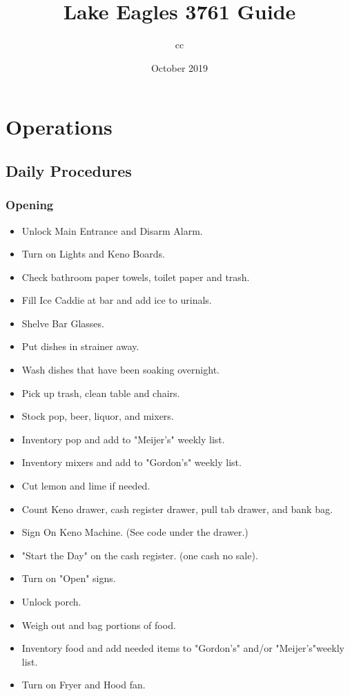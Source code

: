 \documentclass[11pt]{article}
\author{cc}
\date{October 2019}
\title{Lake Eagles 3761 Guide}
\begin{document}
\maketitle
\tableofcontents



\section{Operations}
\label{sec-1}

\subsection{Daily Procedures}
\label{sec-1-1}

\subsubsection{Opening}
\label{sec-1-1-1}
\begin{itemize}
\item Unlock Main Entrance and Disarm Alarm.
\item Turn on Lights and Keno Boards.
\item Check bathroom paper towels, toilet paper and trash.
\item Fill Ice Caddie at bar and add ice to urinals.
\item Shelve Bar Glasses.
\item Put dishes in strainer away.
\item Wash dishes that have been soaking overnight.
\item Pick up trash, clean table and chairs.
\item Stock pop, beer, liquor, and mixers.
\item Inventory pop and add to "Meijer's" weekly list.
\item Inventory mixers and add to "Gordon's" weekly list.
\item Cut lemon and lime if needed.
\item Count Keno drawer, cash register drawer, pull tab drawer, and bank bag.
\item Sign On Keno Machine. (See code under the drawer.)
\item "Start the Day" on the cash register. (one cash no sale).
\item Turn on "Open" signs.
\item Unlock porch.
\item Weigh out and bag portions of food.
\item Inventory food and add needed items to "Gordon's" and/or "Meijer's"weekly list.
\item Turn on Fryer and Hood fan.
\end{itemize}
\end{document}
